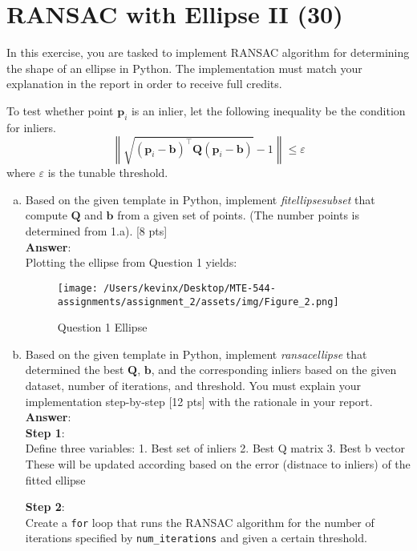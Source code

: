 \section{RANSAC with Ellipse II (30)}
In this exercise, you are tasked to implement RANSAC algorithm for determining the shape of an ellipse in Python. The implementation must match your explanation in the report in order to receive full credits.

To test whether point $\mathbf{p}_i$ is an inlier, let the following inequality be the condition for inliers.
\begin{equation*}
    \left\|\sqrt{(\mathbf{p}_i-\mathbf{b})^\top\mathbf{Q}(\mathbf{p}_i-\mathbf{b})}-1\right\|\leq \varepsilon
\end{equation*}
where $\varepsilon$ is the tunable threshold.
\begin{enumerate}[a.)]
\item Based on the given template in Python, implement \textit{fit\textunderscore ellipse\textunderscore subset} that compute $\mathbf{Q}$ and $\mathbf{b}$ from a given set of points. (The number points is determined from 1.a). [8 pts] \\
\textbf{Answer}: \\
Plotting the ellipse from Question 1 yields:
\begin{figure}[H] %
    \centering
    \texttt{[image: /Users/kevinx/Desktop/MTE-544-assignments/assignment\_2/assets/img/Figure\_2.png]} %
    \caption{Question 1 Ellipse}
    \label{fig:your_label}
\end{figure}
\item Based on the given template in Python, implement \textit{ransac\textunderscore ellipse} that determined the best $\mathbf{Q}$, $\mathbf{b}$, and the corresponding inliers based on the given dataset, number of iterations, and threshold. You must explain your implementation step-by-step [12 pts]
 with the rationale in your report. \\
\textbf{Answer}: \\
 \textbf{Step 1}: \\
 Define three variables:
 1. Best set of inliers
 2. Best Q matrix 
 3. Best b vector 
 These will be updated according based on the error (distnace to inliers) of the fitted ellipse 
 
 \textbf{Step 2}: \\
 Create a \texttt{for} loop that runs the RANSAC algorithm for the number of iterations specified by \texttt{num\_iterations} and given a certain threshold. 
 

\end{enumerate}
